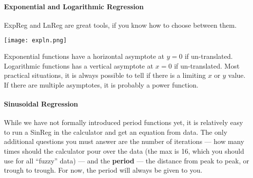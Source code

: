\paragraph{Exponential and Logarithmic Regression}
ExpReg and LnReg are great tools, if you know how to choose between them.

\texttt{[image: expln.png]}

Exponential functions have a horizontal asymptote at $y=0$ if un-translated.  Logarithmic functions
has a vertical asymptote at $x=0$ if un-translated.  Most practical situations, it is always possible to tell if
there is a limiting $x$ or $y$ value.  If there are multiple asymptotes, it is probably a power function.

\paragraph{Sinusoidal Regression}
While we have not formally introduced period functions yet, it is relatively easy to run a SinReg in the calculator
and get an equation from data.  The only additional questions you must answer are the number of iterations ---
how many times should the calculator pour over the data (the max is 16, which you should use for all ``fuzzy''
data) --- and the \textbf{period} --- the distance from peak to peak, or trough to trough.  For now, the period will
always be given to you.
